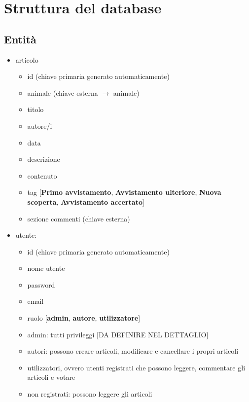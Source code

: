\section{Struttura del database}

\subsection{Entità}
    \begin{itemize}
        \item articolo
        \begin{itemize}
            \item id (chiave primaria generato automaticamente)
            \item animale (chiave esterna $\rightarrow$ animale)
            \item titolo
            \item autore/i
            \item data
            \item descrizione
            \item contenuto
            \item tag [\textbf{Primo avvistamento}, \textbf{Avvistamento ulteriore}, \textbf{Nuova scoperta}, \textbf{Avvistamento accertato}]
            \item sezione commenti (chiave esterna)
        \end{itemize}

        \item utente:
        \begin{itemize}
            \item id (chiave primaria generato automaticamente)
            \item nome utente
            \item password
            \item email
            \item ruolo [\textbf{admin}, \textbf{autore}, \textbf{utilizzatore}]
        \end{itemize}

        \begin{itemize}
            \item admin: tutti privileggi [DA DEFINIRE NEL DETTAGLIO]
            \item autori: possono creare articoli, modificare e cancellare i propri articoli
            \item utilizzatori, ovvero utenti registrati che possono leggere, commentare gli articoli e votare
            \item non registrati: possono leggere gli articoli
        \end{itemize}


\end{itemize}
